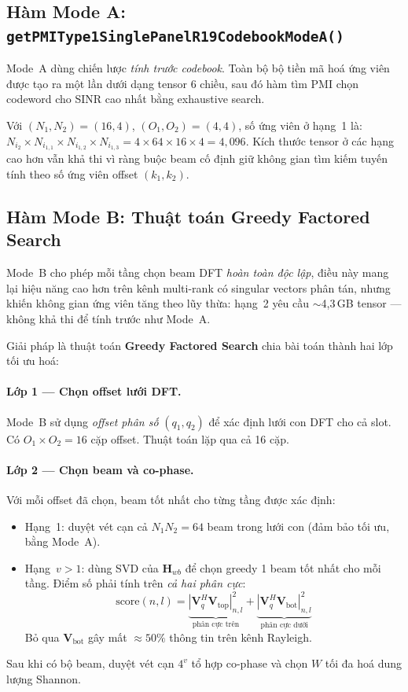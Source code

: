 \documentclass[11pt,a4paper]{article}
\begin{document}
\subsection{Hàm Mode A: \texttt{getPMIType1SinglePanelR19CodebookModeA()}}

Mode~A dùng chiến lược \emph{tính trước codebook}. Toàn bộ bộ tiền mã hoá
ứng viên được tạo ra một lần dưới dạng tensor 6 chiều, sau đó hàm tìm PMI
chọn codeword cho SINR cao nhất bằng exhaustive search.

Với $(N_1,N_2)=(16,4)$, $(O_1,O_2)=(4,4)$, số ứng viên ở hạng~1 là:
$N_{i_2} \times N_{i_{1,1}} \times N_{i_{1,2}} \times N_{i_{1,3}} = 4 \times 64 \times 16 \times 4 = 4{,}096$.
Kích thước tensor ở các hạng cao hơn vẫn khả thi vì ràng buộc beam cố định
giữ không gian tìm kiếm tuyến tính theo số ứng viên offset $(k_1,k_2)$.

\subsection{Hàm Mode B: Thuật toán Greedy Factored Search}

Mode~B cho phép mỗi tầng chọn beam DFT \emph{hoàn toàn độc lập}, điều này
mang lại hiệu năng cao hơn trên kênh multi-rank có singular vectors phân tán,
nhưng khiến không gian ứng viên tăng theo lũy thừa: hạng~2 yêu cầu $\sim$4,3\,GB
tensor --- không khả thi để tính trước như Mode~A.

Giải pháp là thuật toán \textbf{Greedy Factored Search} chia bài toán thành
hai lớp tối ưu hoá:

\paragraph{Lớp 1 --- Chọn offset lưới DFT.}
Mode~B sử dụng \emph{offset phân số} $(q_1, q_2)$ để xác định lưới con DFT
cho cả slot. Có $O_1 \times O_2 = 16$ cặp offset. Thuật toán lặp qua cả 16 cặp.

\paragraph{Lớp 2 --- Chọn beam và co-phase.}
Với mỗi offset đã chọn, beam tốt nhất cho từng tầng được xác định:
\begin{itemize}[noitemsep]
  \item Hạng~1: duyệt vét cạn cả $N_1 N_2 = 64$ beam trong lưới con
        (đảm bảo tối ưu, bằng Mode~A).
  \item Hạng~$v > 1$: dùng SVD của $\mathbf{H}_{wb}$ để chọn greedy 1 beam
        tốt nhất cho mỗi tầng. Điểm số phải tính trên \emph{cả hai phân cực}:
        \begin{equation}
          \text{score}(n,l)
          = \underbrace{|\mathbf{V}_q^H\mathbf{V}_\text{top}|_{n,l}^2}_{\text{phân cực trên}}
          + \underbrace{|\mathbf{V}_q^H\mathbf{V}_\text{bot}|_{n,l}^2}_{\text{phân cực dưới}}
        \end{equation}
        Bỏ qua $\mathbf{V}_\text{bot}$ gây mất $\approx50\%$ thông tin trên kênh Rayleigh.
\end{itemize}
Sau khi có bộ beam, duyệt vét cạn $4^v$ tổ hợp co-phase và chọn $W$ tối đa hoá
dung lượng Shannon.
\end{document}
